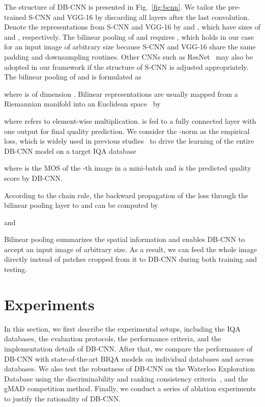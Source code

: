 \documentclass[journal]{IEEEtran}
\begin{document}
The structure of DB-CNN is presented in Fig.~\ref{fig:bcnn}. We tailor the pre-trained S-CNN and VGG-16 by discarding all layers after the last convolution. Denote the representations from S-CNN and VGG-16 by
 and , which have sizes of  and , respectively. The bilinear pooling of  and  requires , which holds in our case for an input image of arbitrary size because S-CNN and VGG-16 share the same padding and downsampling routines.
Other CNNs such as ResNet~\cite{he2016deep} may also be adopted in our framework if the structure of S-CNN is adjusted appropriately. The bilinear pooling of  and  is formulated as

where  is of dimension . Bilinear representations are usually mapped from a Riemannian manifold into an Euclidean space~\cite{pennec2006riemannian} by

where  refers to element-wise multiplication.  is fed to a fully connected layer with one output for final quality prediction. We consider the -norm as the empirical loss, which is widely used in previous studies~\cite{kang2014convolutional,bosse2016deep,kim2017deep} to drive the learning of the entire DB-CNN model on a target IQA database

where  is the MOS of the -th image in a mini-batch and  is the predicted quality score by DB-CNN.

According to the chain rule, the backward propagation of the loss  through the bilinear pooling layer to  and  can be computed by

and

Bilinear pooling summarizes the spatial information and enables DB-CNN to accept an input image of arbitrary size. As a result, we can feed the whole image directly instead of patches cropped from it to DB-CNN during both training and testing.


\section{Experiments}\label{sec:exp}
In this section, we first describe the experimental setups, including the IQA databases, the evaluation protocols, the performance criteria, and the implementation details of DB-CNN. After that, we compare the performance of DB-CNN with state-of-the-art BIQA models on individual databases and across databases. We also test the robustness of DB-CNN on the Waterloo Exploration Database using the discriminability and ranking consistency criteria~\cite{ma2017waterloo}, and the gMAD competition method. Finally, we conduct a series of ablation experiments to justify the rationality of DB-CNN.
\end{document}
